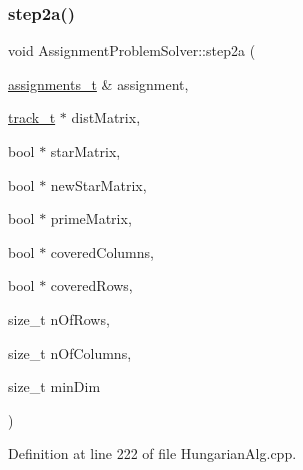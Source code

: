 \subsubsection{\texorpdfstring{step2a()}{step2a()}}
{\footnotesize\ttfamily void Assignment\+Problem\+Solver\+::step2a (\begin{DoxyParamCaption}\item[{\mbox{\hyperlink{_hungarian_alg_8h_ad7b9f569a9adbd958c668a36b6884ffd}{assignments\+\_\+t}} \&}]{assignment,  }\item[{\mbox{\hyperlink{defines_8h_a7ce9c8817b42ab418e61756f579549ab}{track\+\_\+t}} $\ast$}]{dist\+Matrix,  }\item[{bool $\ast$}]{star\+Matrix,  }\item[{bool $\ast$}]{new\+Star\+Matrix,  }\item[{bool $\ast$}]{prime\+Matrix,  }\item[{bool $\ast$}]{covered\+Columns,  }\item[{bool $\ast$}]{covered\+Rows,  }\item[{size\+\_\+t}]{n\+Of\+Rows,  }\item[{size\+\_\+t}]{n\+Of\+Columns,  }\item[{size\+\_\+t}]{min\+Dim }\end{DoxyParamCaption})\hspace{0.3cm}{\ttfamily [private]}}



Definition at line 222 of file Hungarian\+Alg.\+cpp.



